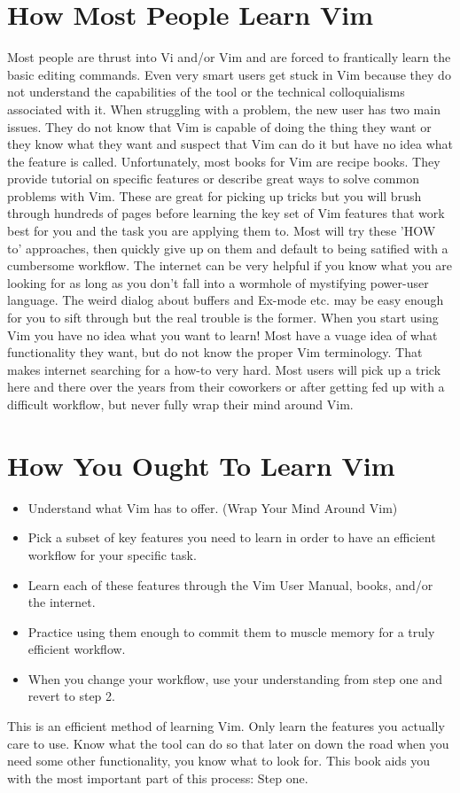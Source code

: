 \documentclass[12pt]{book}
\begin{document}
\section{How Most People Learn Vim}
Most people are thrust into Vi and/or Vim and are forced to frantically learn the basic editing commands.
Even very smart users get stuck in Vim because they do not understand the capabilities of the tool or the technical colloquialisms associated with it.
When struggling with a problem, the new user has two main issues.
They do not know that Vim is capable of doing the thing they want or they know what they want and suspect that Vim can do it but have no idea what the feature is called.
Unfortunately, most books for Vim are recipe books.
They provide tutorial on specific features or describe great ways to solve common problems with Vim.
These are great for picking up tricks but you will brush through hundreds of pages before learning the key set of Vim features that work best for you and the task you are applying them to.
Most will try these 'HOW to' approaches, then quickly give up on them and default to being satified with a cumbersome workflow.
The internet can be very helpful if you know what you are looking for as long as you don't fall into a wormhole of mystifying power-user language.
The weird dialog about buffers and Ex-mode etc. may be easy enough for you to sift through but the real trouble is the former.
When you start using Vim you have no idea what you want to learn!
Most have a vuage idea of what functionality they want, but do not know the proper Vim terminology.
That makes internet searching for a how-to very hard.
Most users will pick up a trick here and there over the years from their coworkers or after getting fed up with a difficult workflow, but never fully wrap their mind around Vim.

\section{How You Ought To Learn Vim}
\begin{itemize}
\item Understand what Vim has to offer. (Wrap Your Mind Around Vim)
\item Pick a subset of key features you need to learn in order to have an efficient workflow for your specific task.
\item Learn each of these features through the Vim User Manual, books, and/or the internet.
\item Practice using them enough to commit them to muscle memory for a truly efficient workflow.
\item When you change your workflow, use your understanding from step one and revert to step 2.
\end{itemize}
This is an efficient method of learning Vim.
Only learn the features you actually care to use.
Know what the tool can do so that later on down the road when you need some other functionality, you know what to look for.
This book aids you with the most important part of this process: Step one.
\end{document}
